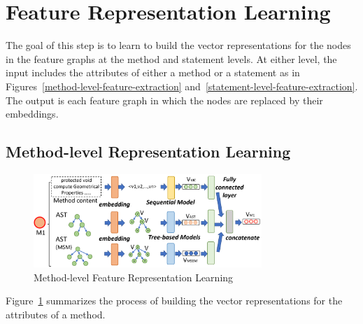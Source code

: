 \section{Feature Representation Learning}
\label{feature-learning:sec}

The goal of this step is to learn to build the vector representations
for the nodes in the feature graphs at the method and statement levels.
At either level, the input includes the attributes of either a method
or a statement as in Figures~\ref{method-level-feature-extraction}
and~\ref{statement-level-feature-extraction}. The output is each
feature graph in which the nodes are replaced by their embeddings.



\subsection{Method-level Representation Learning}

\begin{figure}[t]
	\centering
	\includegraphics[width=3.4in]{graphs/step-2-method-new.png}
        \vspace{-14pt}
	\caption{Method-level Feature Representation Learning}
	\label{method-level-feature-learning}
\end{figure}


Figure~\ref{method-level-feature-learning} summarizes the process of
building the vector representations for the attributes of a method.

